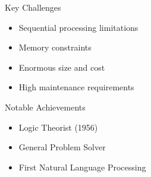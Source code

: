 \documentclass[aspectratio=169,t,xcolor=table]{beamer}
\begin{document}
\begin{frame}
\begin{columns}[t]
        \begin{column}{0.38\textwidth}
            \begin{alertblock}{Key Challenges}
                \small %
                \begin{itemize}\setlength{\itemsep}{0pt} %
                    \item Sequential processing limitations
                    \item Memory constraints
                    \item Enormous size and cost
                    \item High maintenance requirements
                \end{itemize}
            \end{alertblock}
            \begin{exampleblock}{Notable Achievements}
                \small %
                \begin{itemize}\setlength{\itemsep}{0pt} %
                    \item Logic Theorist (1956)
                    \item General Problem Solver
                    \item First Natural Language Processing
                \end{itemize}
            \end{exampleblock}
            
        \end{column}
    \end{columns}
\end{frame}
\end{document}
